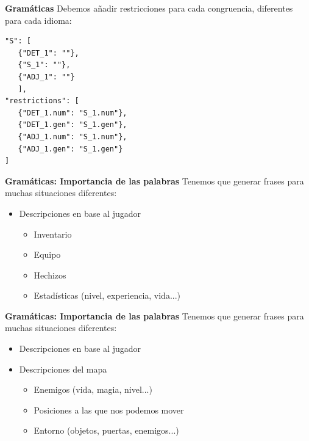 \begin{frame}[t, fragile]{\textbf{Gramáticas}}
	Debemos añadir restricciones para cada congruencia, diferentes para cada idioma:
	\begin{verbatim}
"S": [
   {"DET_1": ""},
   {"S_1": ""},
   {"ADJ_1": ""}
   ],
"restrictions": [
   {"DET_1.num": "S_1.num"},
   {"DET_1.gen": "S_1.gen"},
   {"ADJ_1.num": "S_1.num"},
   {"ADJ_1.gen": "S_1.gen"}
]
	\end{verbatim}
\end{frame}


\begin{frame}[t, fragile]{\textbf{Gramáticas: Importancia de las palabras}}
	Tenemos que generar frases para muchas situaciones diferentes:
	\begin{itemize}
		\item<+-| alert@+> Descripciones en base al jugador
			\begin{itemize}
				\item Inventario
				\item Equipo
				\item Hechizos
				\item Estadísticas (nivel, experiencia, vida...)
			\end{itemize}
	\end{itemize}
\end{frame}

\begin{frame}[t, fragile]{\textbf{Gramáticas: Importancia de las palabras}}
	Tenemos que generar frases para muchas situaciones diferentes:
	\begin{itemize}
		\item Descripciones en base al jugador
		\item<+-| alert@+> Descripciones del mapa
			\begin{itemize}
				\item Enemigos (vida, magia, nivel...)
				\item Posiciones a las que nos podemos mover
				\item Entorno (objetos, puertas, enemigos...)
			\end{itemize}
	\end{itemize}
\end{frame}

